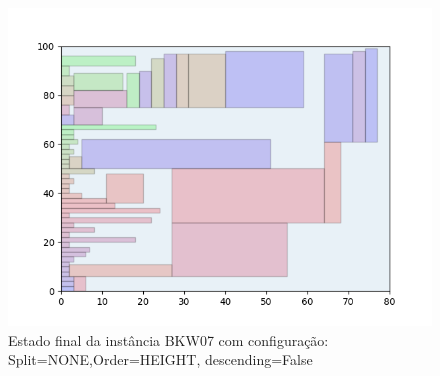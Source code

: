 \begin{figure}[H]
    \centering
    \caption[]{Estado final da instância BKW07 com configuração: Split=NONE,Order=HEIGHT, descending=False}
    \label{fig:bkw07-none-height-false}
    \includegraphics[scale=0.5]{output/figures/bkw/bkw07/none/height/false/00}
\end{figure}